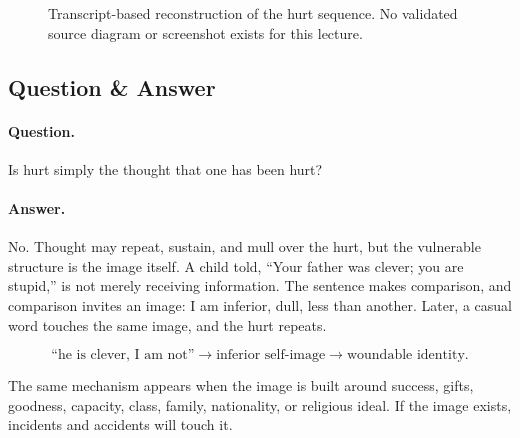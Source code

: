 \documentclass[11pt,oneside]{book}
\begin{document}
\begin{figure}
\centering
{}

Transcript-based reconstruction of the hurt sequence. No validated source diagram or screenshot exists for this lecture.
\end{figure}

\subsection{Question \& Answer}

\paragraph{Question.}
Is hurt simply the thought that one has been hurt?

\paragraph{Answer.}
No. Thought may repeat, sustain, and mull over the hurt, but the vulnerable structure is the image itself. A child told, ``Your father was clever; you are stupid,'' is not merely receiving information. The sentence makes comparison, and comparison invites an image: I am inferior, dull, less than another. Later, a casual word touches the same image, and the hurt repeats.

\begin{equation}
\text{``he is clever, I am not''}
\longrightarrow
\text{inferior self-image}
\longrightarrow
\text{woundable identity}.
\end{equation}

The same mechanism appears when the image is built around success, gifts, goodness, capacity, class, family, nationality, or religious ideal. If the image exists, incidents and accidents will touch it.
\end{document}
